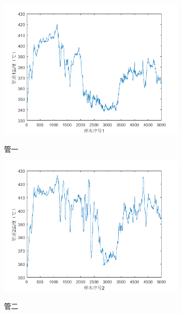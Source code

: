         \begin{figure}[H]
            \centering
            \begin{subfigure}{0.32\textwidth}
                \includegraphics[width=\textwidth]{figures/p1_1.png}
                \label{p1_1}
                \caption{管一}
            \end{subfigure}
            \begin{subfigure}{0.32\textwidth}
                \includegraphics[width=\textwidth]{figures/p1_2.png}
                \label{p1_2}
                \caption{管二}
            \end{subfigure}
            \begin{subfigure}{0.32\textwidth}

\end{subfigure}
\end{figure}
